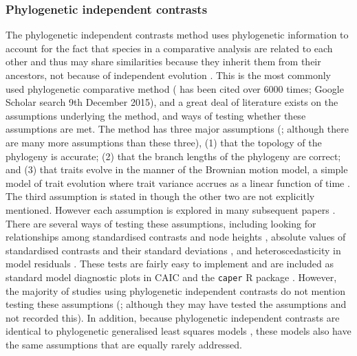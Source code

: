 \documentclass[a4paper,12pt]{article}
\begin{document}
\subsubsection{Phylogenetic independent contrasts}
The phylogenetic independent contrasts method uses phylogenetic information to account for the fact that species in a comparative analysis are related to each other and thus may share similarities because they inherit them from their ancestors, not because of independent evolution \citep{felsenstein1985phylogenies,harvey1991comparative}. 
This is the most commonly used phylogenetic comparative method (\citet{felsenstein1985phylogenies} has been cited over 6000 times; Google Scholar search 9th December 2015), and a great deal of literature exists on the assumptions underlying the method, and ways of testing whether these assumptions are met. 
The method has three major assumptions (\citealp{diaz1996testing}; although there are many more assumptions than these three), (1) that the topology of the phylogeny is accurate; (2) that the branch lengths of the phylogeny are correct; and (3) that traits evolve in the manner of the Brownian motion model, a simple model of trait evolution where trait variance accrues as a linear function of time \citep{cavalli1967,felsenstein1973maximum}.
The third assumption is stated in \citet{felsenstein1985phylogenies} though the other two are not explicitly mentioned. 
However each assumption is explored in many subsequent papers \citep[e.g.][]{felsenstein1988phylogenies,grafen1989phylogenetic,harvey1991comparative,garland1992procedures,purvis1995comparative,diaz1996testing,hansen1996translating,martins1997phylogenies,freckleton2000phylogenetic,garland2000using,hansen2005assessing,freckleton2006detecting,rohle2006comment}.
There are several ways of testing these assumptions, including looking for relationships among standardised contrasts and node heights \citep{grafen1989phylogenetic,freckleton2006detecting}, absolute values of standardised contrasts and their standard deviations \citep{garland1992procedures,diaz1996testing}, and heteroscedasticity in model residuals \citep{purvis1995mammal}.
These tests are fairly easy to implement and are included as standard model diagnostic plots in CAIC and the \texttt{caper} R package \citep{purvis1995comparative,Orme:2013aa,R-Core-Team:2014aa}.
However, the majority of studies using phylogenetic independent contrasts do not mention testing these assumptions (\citealp{freckleton2006detecting}; although they may have tested the assumptions and not recorded this).
In addition, because phylogenetic independent contrasts are identical to phylogenetic generalised least squares models \citep{garland2000using,rohle2006comment,blomberg2012independent}, these models also have the same assumptions that are equally rarely addressed. 
\end{document}
